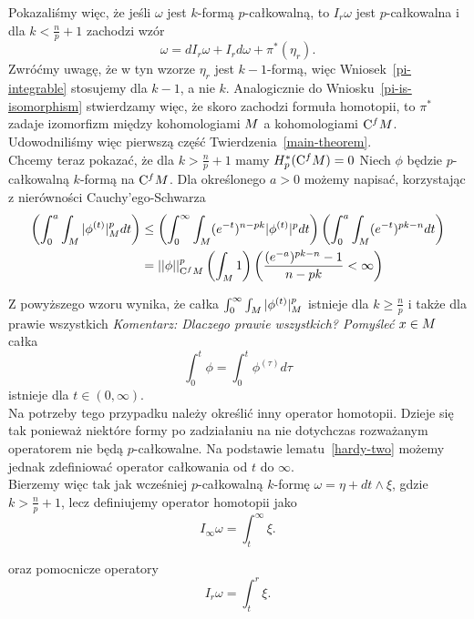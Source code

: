 \documentclass[licencjacka]{pracamgr}
\theoremstyle{definition}
\theoremstyle{definition}
\theoremstyle{plain}
\theoremstyle{plain}
\theoremstyle{plain}
\theoremstyle{plain}
\def\cfm{\ensuremath\mathrm{C}^fM}
\def\M{\ensuremath M}
\begin{document}
Pokazaliśmy więc, że jeśli $\omega$ jest $k$-formą $p$-całkowalną, to  $I_r
\omega$ jest $p$-całkowalna i dla $k < \frac{n}{p} + 1$  zachodzi wzór
\[
    \omega = dI_r \omega + I_r d \omega + \pi^\ast 
    \left(
        \eta_{r}
    \right).
\]
Zwróćmy uwagę, że w tyn wzorze $\eta_r$ jest $k-1$-formą, więc
Wniosek~\ref{pi-integrable} stosujemy dla $k-1$, a nie $k$. Analogicznie do
Wniosku~\ref{pi-is-isomorphism} stwierdzamy więc, że skoro zachodzi 
formuła homotopii, to  $\pi^\ast$ zadaje izomorfizm między kohomologiami $\M$
a kohomologiami $\cfm$.
Udowodniliśmy więc pierwszą część Twierdzenia~\ref{main-theorem}. \\

Chcemy teraz pokazać, że dla $k > \frac{n}{p} + 1$ mamy $H^\ast_p(\cfm) = 0$
Niech $\phi$ będzie $p$-całkowalną $k$-formą na $\cfm$. Dla określonego $a > 0$
możemy napisać, korzystając z nierówności Cauchy'ego-Schwarza
\begin{align*}
\left(
    \int_0^a \int_\M |\phi^{(t)}|_M^p dt
\right) & \leq 
\left(
    \int_0^\infty \int_\M (e^{-t})^{n-pk} |\phi^{(t)}|^p dt
\right)
\left(
    \int_0^a \int_\M (e^{-t})^{pk-n} dt 
\right) \\
&= 
    ||\phi||_{\cfm}^p 
\left(
    \int_\M 1
\right)
\left(
    \frac{ (e^{-a})^{pk-n} - 1 }{n-pk} < \infty
\right) \\
\end{align*}

Z powyższego wzoru wynika, że całka $\int_0^\infty \int_\M |\phi^{(t)}|_M^p$ 
istnieje dla $k \geq \frac{n}{p}$ i także dla prawie wszystkich
\emph{Komentarz: Dlaczego prawie wszystkich? Pomyśleć}
$x \in \M$ całka
\[
\int_0^t \phi = \int_0^t \phi^{(\tau)} d\tau
\]
istnieje dla $t \in (0, \infty)$. \\



Na potrzeby tego przypadku należy określić inny operator homotopii.  Dzieje się
tak ponieważ niektóre formy po zadziałaniu na nie dotychczas rozważanym
operatorem nie będą $p$-całkowalne. Na podstawie lematu~\ref{hardy-two} możemy
jednak zdefiniować operator całkowania od $t$ do $\infty$. \\

Bierzemy więc tak jak wcześniej $p$-całkowalną $k$-formę $\omega = \eta + dt \wedge \xi$,
 gdzie $k > \frac{n}{p} + 1$,  lecz definiujemy operator homotopii jako
\[
I_\infty \omega = \int_t^\infty \xi.
\]

oraz pomocnicze operatory
\[
I_r \omega = \int_t^r \xi. 
\]
\end{document}
